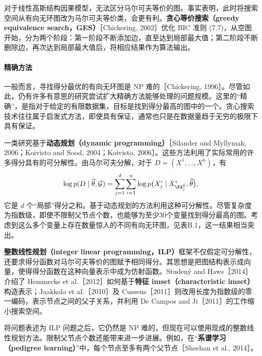 对于线性高斯结构因果模型，无法区分马尔可夫等价的图。事实表明，此时将搜索空间从有向无环图改为马尔可夫等价类，会更有利。\textbf{贪心等价搜索（greedy equivalence search，GES）}［Chickering, 2002］优化 BIC 准则 (7.7)，从空图开始，分为两个阶段：第一阶段不断添加边，直至达到局部最大值；第二阶段不断删除边，再次达到局部最大值后，将相应结果作为算法输出。

\paragraph{精确方法}
一般而言，寻找得分最优的有向无环图是 NP 难的［Chickering, 1996］。尽管如此，仍有许多有意思的研究尝试扩大精确方法能够处理的问题规模。这里的“精确”，是指对于给定的有限数据集，目标是找到得分最高的图中的一个。贪心搜索技术往往属于启发式方法，即使具有保证，通常也只是在数据量趋于无穷的极限下具有保证。

一类研究基于\textbf{动态规划（dynamic programming）}［Silander and Myllymak, 2006；Koivisto and Sood, 2004；Koivisto, 2006］。这些方法利用了实际常用的许多得分具有的可分解性。由马尔可夫分解，对于 $D=(X^1,\ldots,X^n)$，有
\[
 \log p(D\mid\widehat\theta,\mathcal G)=
 \sum_{j=1}^d\sum_{i=1}^n
 \log p\bigl(X_j^i\mid X_{\PA_j^{\mathcal G}}^i,\widehat\theta\bigr),
\]
它是 $d$ 个“局部”得分之和。基于动态规划的方法利用这种可分解性。尽管复杂度为指数级，即使不限制父节点个数，也能够为至少30个变量找到得分最高的图。考虑到这么多个变量上存在数量惊人的不同有向无环图，见表B.1，这一结果相当突出。

\textbf{整数线性规划（integer linear programming，ILP）}框架不仅假定可分解性，还要求得分函数对马尔可夫等价的图赋予相同得分。其思想是把图结构表示成向量，使得得分函数在这种向量表示中成为仿射函数。Studený and Haws［2014］介绍了 Hemmecke et al.［2012］如何基于\textbf{特征 imset（characteristic imset）}构造表示；Jaakkola et al.［2010］及 Cussens［2011］则改用长度为指数级的零一编码，表示节点之间的父子关系，并利用 De Campos and Ji［2011］的工作缩小搜索空间。

将问题表述为 ILP 问题之后，它仍然是 NP 难的，但现在可以使用现成的整数线性规划方法。限制父节点个数还能带来进一步进展。例如，在“\textbf{系谱学习（pedigree learning）}”中，每个节点至多有两个父节点［Sheehan et al., 2014］。
